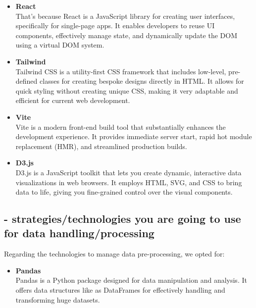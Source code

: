 \documentclass{article}
\begin{document}
\begin{itemize}

    \item \textbf{React} \\
    That's because React is a JavaScript library for creating user interfaces, specifically for single-page apps. 
    It enables developers to reuse UI components, effectively manage state, and dynamically update the DOM using a virtual DOM system.

    \item \textbf{Tailwind} \\
    Tailwind CSS is a utility-first CSS framework that includes low-level, pre-defined classes for creating bespoke designs directly in HTML. 
    It allows for quick styling without creating unique CSS, making it very adaptable and efficient for current web development.

    \item \textbf{Vite} \\
    Vite is a modern front-end build tool that substantially enhances the development experience. 
    It provides immediate server start, rapid hot module replacement (HMR), and streamlined production builds.

    \item \textbf{D3.js} \\
    D3.js is a JavaScript toolkit that lets you create dynamic, interactive data visualizations in web browsers. 
    It employs HTML, SVG, and CSS to bring data to life, giving you fine-grained control over the visual components.

\end{itemize}


\subsection{- strategies/technologies you are going to use for data handling/processing}
Regarding the technologies to manage data pre-processing, we opted for:

\begin{itemize}

    \item \textbf{Pandas} \\
    Pandas is a Python package designed for data manipulation and analysis. 
    It offers data structures like as DataFrames for effectively handling and transforming huge datasets.

\end{itemize}
\end{document}
